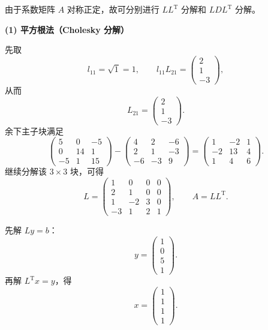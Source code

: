 \documentclass[11pt, a4paper]{ctexart}
\begin{document}
\begin{solution}
    由于系数矩阵 $A$ 对称正定，故可分别进行 $LL^{\mathrm{T}}$ 分解和 $LDL^{\mathrm{T}}$ 分解。

    \textbf{(1) 平方根法（Cholesky 分解）}

    先取
    \[
        l_{11} = \sqrt{1} = 1,\qquad
        l_{11} L_{21} =
        \begin{pmatrix}
            2 \\
            1 \\
            -3
        \end{pmatrix},
    \]
    从而
    \[
        L_{21} =
        \begin{pmatrix}
            2 \\
            1 \\
            -3
        \end{pmatrix}.
    \]
    余下主子块满足
    \[
        \begin{pmatrix}
            5 & 0 & -5 \\
            0 & 14 & 1 \\
            -5 & 1 & 15
        \end{pmatrix}
        -
        \begin{pmatrix}
            4 & 2 & -6 \\
            2 & 1 & -3 \\
            -6 & -3 & 9
        \end{pmatrix}
        =
        \begin{pmatrix}
            1 & -2 & 1 \\
            -2 & 13 & 4 \\
            1 & 4 & 6
        \end{pmatrix}.
    \]
    继续分解该 $3 \times 3$ 块，可得
    \[
        L =
        \begin{pmatrix}
            1 & 0 & 0 & 0 \\
            2 & 1 & 0 & 0 \\
            1 & -2 & 3 & 0 \\
            -3 & 1 & 2 & 1
        \end{pmatrix},
        \qquad
        A = LL^{\mathrm{T}}.
    \]

    先解 $Ly = b$：
    \[
        y =
        \begin{pmatrix}
            1 \\
            0 \\
            5 \\
            1
        \end{pmatrix}.
    \]
    再解 $L^{\mathrm{T}}x = y$，得
    \[
        x =
        \begin{pmatrix}
            1 \\
            1 \\
            1 \\
            1
        \end{pmatrix}.
    \]


\end{solution}
\end{document}
